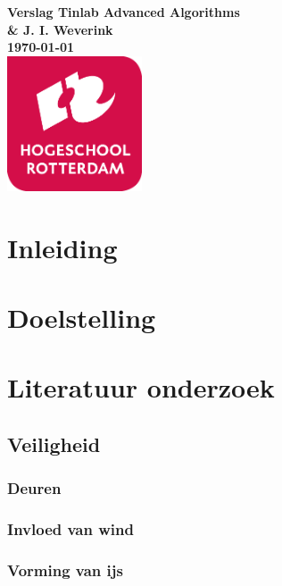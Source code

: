 \documentclass{article}
\begin{document}
\sffamily
\begin{titlepage}
  \centering
    \vfill
    {\bfseries\Huge
      Verslag Tinlab Advanced Algorithms \\
        \vskip2cm
      }
      {\bfseries\Large
        \& J. I. Weverink\\
      }
      {
        \bfseries\normalsize
        \vskip1cm
        \today\\
    }
    \vfill
    \includegraphics[width=4cm]{Images/logohr.png} %
    \vfill
    \vfill
\end{titlepage}
\newpage
\tableofcontents

\clearpage %
\section{Inleiding}

\clearpage %
\section{Doelstelling} 

\clearpage %
\section{Literatuur onderzoek} %

\subsection{Veiligheid}

\subsubsection{Deuren}

\subsubsection{Invloed van wind}

\subsubsection{Vorming van ijs}




\begin{thebibliography}{9}
\end{thebibliography}
\end{document}
